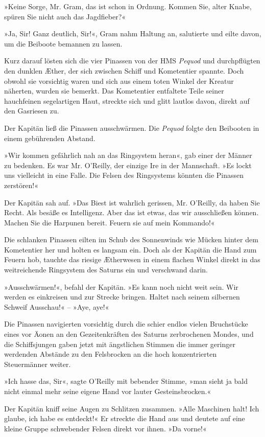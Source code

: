 »Keine Sorge, Mr. Gram, das ist schon in Ordnung. Kommen Sie, alter
Knabe, spüren Sie nicht auch das Jagdfieber?«

»Ja, Sir! Ganz deutlich, Sir!«, Gram nahm Haltung an, salutierte
und eilte davon, um die Beiboote bemannen zu lassen.

Kurz darauf lösten sich die vier Pinassen von der HMS \textit{Pequod} und
durchpflügten den dunklen Æther, der sich zwischen Schiff und
Kometentier spannte. Doch obwohl sie vorsichtig waren und sich aus
einem toten Winkel der Kreatur näherten, wurden sie bemerkt. Das
Kometentier entfaltete Teile seiner hauchfeinen segelartigen Haut,
streckte sich und glitt lautlos davon, direkt auf den Gasriesen
zu.

Der Kapitän ließ die Pinassen ausschwärmen. Die \textit{Pequod} folgte den
Beibooten in einem gebührenden Abstand.

»Wir kommen gefährlich nah an das Ringsystem heran«, gab einer der
Männer zu bedenken. Es war Mr. O’Reilly, der einzige Ire in der
Mannschaft. »Es lockt uns vielleicht in eine Falle. Die Felsen des
Ringsystems könnten die Pinassen zerstören!«

Der Kapitän sah auf. »Das Biest ist wahrlich gerissen, Mr.
O’Reilly, da haben Sie Recht. Als besäße es Intelligenz. Aber das
ist etwas, das wir ausschließen können. Machen Sie die Harpunen
bereit. Feuern sie auf mein Kommando!«

Die schlanken Pinassen eilten im Schub des Sonnenwinds wie Mücken
hinter dem Kometentier her und holten es langsam ein. Doch als der
Kapitän die Hand zum Feuern hob, tauchte das riesige Ætherwesen in
einem flachen Winkel direkt in das weitreichende Ringsystem des
Saturns ein und verschwand darin.

»Ausschwärmen!«, befahl der Kapitän. »Es kann noch nicht weit sein.
Wir werden es einkreisen und zur Strecke bringen. Haltet nach
seinem silbernen Schweif Ausschau!« – »Aye, aye!«

Die Pinassen navigierten vorsichtig durch die schier endlos vielen
Bruchstücke eines vor Äonen an den Gezeitenkräften des Saturns
zerbrochenen Mondes, und die Schiffsjungen gaben jetzt mit
ängstlichen Stimmen die immer geringer werdenden Abstände zu den
Felsbrocken an die hoch konzentrierten Steuermänner weiter.

»Ich hasse das, Sir«, sagte O’Reilly mit bebender Stimme, »man
sieht ja bald nicht einmal mehr seine eigene Hand vor lauter
Gesteinsbrocken.«

Der Kapitän kniff seine Augen zu Schlitzen zusammen. »Alle
Maschinen halt! Ich glaube, ich habe es entdeckt!« Er streckte die
Hand aus und deutete auf eine kleine Gruppe schwebender Felsen
direkt vor ihnen. »Da vorne!«

